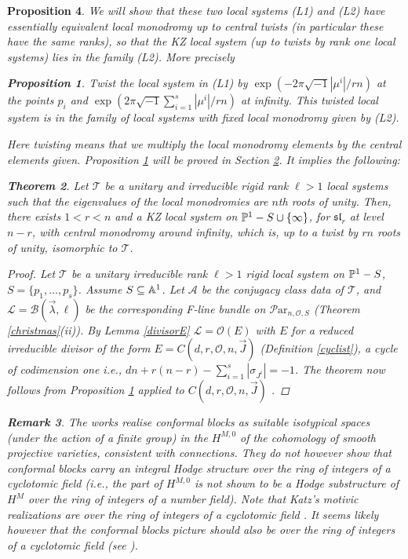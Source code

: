 \documentclass[11pt]{amsart}
\newcommand\rigid{\mathcal{T}}
\newcommand\ml{\mathcal{L}}
\newcommand\Par{\mathcal{P}\text{ar} }
\newtheorem{theorem}{Theorem}[section]
\newtheorem{remark}[theorem]{ Remark}
\newtheorem{proposition}[theorem]{Proposition}
\numberwithin{theorem}{subsection}
\begin{document}
{\begin{proposition}
We will show that these two local systems (L1) and (L2) have essentially equivalent local monodromy up to central twists (in particular these have the same ranks), so that the KZ local system
(up to twists by rank one local systems) lies in the family (L2). More precisely
\begin{proposition}\label{generalKZ}
Twist the local system in (L1) by $\exp(-2\pi\sqrt{-1}|\mu^i|/rn)$ at the points $p_i$ and $\exp(2\pi\sqrt{-1}\sum_{i=1}^s |\mu^i|/rn)$ at infinity. This twisted local system is in the family of local systems with fixed local monodromy given by (L2).
\end{proposition}
Here twisting means that we multiply the local monodromy elements by the central elements given.
Proposition \ref{generalKZ} will be proved in Section \ref{KZe}. It implies the following:
\begin{theorem}\label{KZe}
Let $\rigid$ be a unitary and irreducible rigid rank $\ell>1$ local systems such that the eigenvalues of the local monodromies are  $n$th roots of unity.  Then, there exists $1<r<n$ and a KZ local system on $\Bbb{P}^1-S\cup\{\infty\}$, for $\mathfrak{sl}_r$ at level $n-r$, with central monodromy
around infinity, which is, up to a twist by  $rn$ roots of unity, isomorphic to $\rigid$.
\end{theorem}
\begin{proof}
Let $\rigid$ be a unitary irreducible  rank $\ell>1$ rigid local system on $\Bbb{P}^1-S$, $S=\{p_1,\dots,p_s\}$. Assume $S\subseteq \Bbb{A}^1$. Let $\mathcal{A}$ be the conjugacy class data of
$\rigid$, and $\ml=\mathcal{B}(\vec{\lambda},\ell)$ be the corresponding F-line bundle on $\Par_{n,\mathcal{O},S}$ (Theorem \ref{christmas}(ii)).  By Lemma \ref{divisorE} $\ml=\mathcal{O}(E)$ with $E$ for a reduced irreducible divisor of the form  $E=C(d,r,\mathcal{O},n,\vec{J})$ (Definition  \ref{cyclist}), a cycle  of codimension one i.e., $dn +r(n-r)-\sum_{i=1}^s |\sigma_{J^i}|=-1$. The theorem now follows from Proposition \ref{generalKZ} applied to $C(d,r,\mathcal{O},n,\vec{J})$ .
\end{proof}

\begin{remark}\label{hodge}
The  works  \cite{Ram,BKZ,BM}   realise conformal blocks as suitable  isotypical spaces (under the action of a  finite group) in the $H^{M,0}$ of the cohomology of smooth projective varieties, consistent with connections. They do not however show that conformal blocks carry an integral Hodge structure over the ring of integers of a cyclotomic field (i.e., the part of $H^{M,0}$ is not shown to be a Hodge substructure of $H^M$ over the ring of integers of a number field). Note that Katz's motivic realizations are over the ring of integers of a cyclotomic field \cite[Theorem 8.4.1]{Katz}. It seems likely however that the conformal blocks picture should also be over the ring of integers of a cyclotomic field (see \cite[Question 6.2]{Loo}).
\end{remark}


\end{proposition}}
\end{document}
